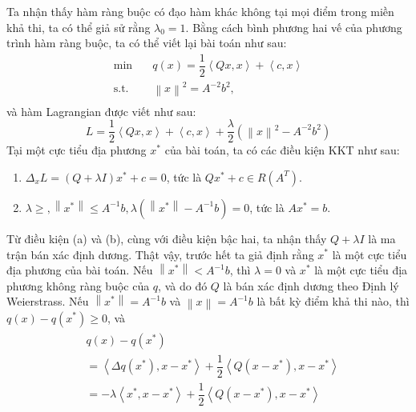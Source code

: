 \begin{solution}

    Ta nhận thấy hàm ràng buộc có đạo hàm khác không tại mọi điểm trong miền khả thi, ta có thể giả sử rằng $\lambda_0 = 1$. Bằng cách bình phương hai vế của phương trình hàm ràng buộc, ta có thể viết lại bài toán như sau:
    \begin{equation}
        \begin{aligned}
            \min \quad & q(x) = \dfrac{1}{2}\left \langle Qx,x \right \rangle + \left \langle c,x \right \rangle\\
            \textrm{s.t.} \quad & \left \| x \right \|^2 = A^{-2}b^2,\\
        \end{aligned}
    \end{equation}
    và hàm Lagrangian được viết như sau:
    \begin{equation}
        L = \dfrac{1}{2}\left \langle Qx,x \right \rangle + \left \langle c,x \right \rangle + \dfrac{\lambda}{2}\left(\left \| x \right \|^2 - A^{-2}b^2\right)
    \end{equation}
    Tại một cực tiểu địa phương $x^*$ của bài toán, ta có các điều kiện KKT như sau:
    \begin{enumerate}[label=(\alph*)]
        \item $\Delta_x L = (Q+\lambda I)x^* + c = 0$, tức là $Qx^* + c \in R(A^T)$.
        \item $\lambda \geq, \left \| x^* \right \| \leq A^{-1}b, \lambda(\left \| x^* \right \| - A^{-1}b) = 0$, tức là $Ax^* = b$.
    \end{enumerate}
    Từ điều kiện (a) và (b), cùng với điều kiện bậc hai, ta nhận thấy $Q + \lambda I$ là ma trận bán xác định dương. Thật vậy, trước hết ta giả định rằng $x^*$ là một cực tiểu địa phương của bài toán. Nếu $\left \| x^* \right \| < A^{-1}b$, thì $\lambda = 0$ và $x^*$ là một cực tiểu địa phương không ràng buộc của $q$, và do đó $Q$ là bán xác định dương theo Định lý Weierstrass. Nếu $\left \| x^* \right \| = A^{-1}b$ và $\left \| x \right \| = A^{-1}b$ là bất kỳ điểm khả thi nào, thì $q(x) - q(x^*) \geq 0$, và
    \begin{align}
        \begin{aligned}
            &q(x) - q(x^*) \\ 
            &=\left \langle \Delta q(x^*), x - x^*\right \rangle + \dfrac{1}{2}\left \langle Q(x-x^*),  x - x^*\right \rangle \\
            &=-\lambda\left \langle  x^*, x - x^*\right \rangle + \dfrac{1}{2}\left \langle Q(x-x^*),  x - x^*\right \rangle \\

\end{aligned}
\end{align}
\end{solution}
